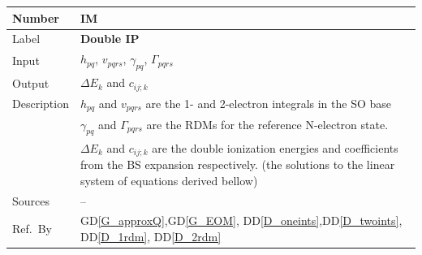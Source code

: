 \documentclass[12pt]{article}
\newcommand{\colAwidth}{0.13\textwidth}
\newcommand{\colBwidth}{0.82\textwidth}
\newcommand{\dref}[1]{GD\ref{#1}}
\newcommand{\ddref}[1]{DD\ref{#1}}
\newcounter{instnum} %
\begin{document}
\noindent
\begin{minipage}{\textwidth}
	\renewcommand*{\arraystretch}{1.5}
	\begin{tabular}{| p{\colAwidth} | p{\colBwidth}|}
		\hline
		\rowcolor[gray]{0.9}
		Number& IM{instnum}\theinstnum \label{IM_DIP}\\
		\hline
		Label& \bf Double IP\\
		\hline
		Input&$h_{pq}$, $v_{pqrs}$, $\gamma_{pq}$, $\Gamma_{pqrs}$\\
		\hline
		Output&$\Delta E_k$ and $c_{ij;k}$\\
		\hline
		Description& $h_{pq} $ and $ v_{pqrs}$ are the 1- and 2-electron 
		integrals in the SO base\\
		& $\gamma_{pq}$ and $\Gamma_{pqrs}$ are the RDMs for the reference 
		N-electron state.\\
		&$\Delta E_k$ and $c_{ij;k}$ are the double ionization energies and 
		coefficients from the BS expansion respectively. (the solutions to the 
		linear 
		system of equations derived bellow)\\
		\hline
		Sources& -- \\
		\hline
		Ref.\ By & \dref{G_approxQ},\dref{G_EOM},  
		\ddref{D_oneints},\ddref{D_twoints}, \ddref{D_1rdm}, 
		\ddref{D_2rdm}\\
		\hline
	\end{tabular}
\end{minipage}\\

~\newline
\end{document}
